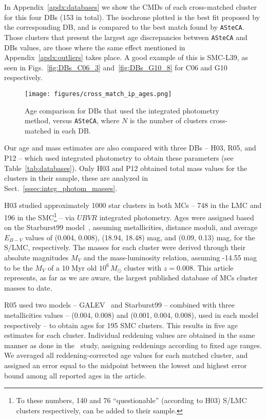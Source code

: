 \documentclass[draft]{aa}
\begin{document}
In Appendix~\ref{apdx:databases} we show the CMDs of each cross-matched cluster
for this four DBs (153 in total). The isochrone plotted is the best fit proposed
by the corresponding DB, and is compared to the best match found by
\texttt{ASteCA}.
Those clusters that present the largest age discrepancies between
\texttt{ASteCA} and DBs values, are those where the same effect mentioned in
Appendix~\ref{apdx:outliers} takes place. A good example of this is SMC-L39, as
seen in Figs.~\ref{fig:DBs_C06_3} and~\ref{fig:DBs_G10_8} for C06 and G10
respectively.\\


%

\begin{figure}
\centering
\texttt{[image: figures/cross\_match\_ip\_ages.png]}
\caption{Age comparison for DBs that used the integrated photometry
method, versus \texttt{ASteCA}, where $N$ is the number of clusters cross-matched in
each DB.\@}
\label{fig:cross_match_ip_age}
\end{figure}

Our age and mass estimates are also compared with three DBs -- H03, R05, and P12
-- which used integrated photometry to obtain these parameters (see
Table~\ref{tab:databases}). Only H03 and P12 obtained total mass values for the
clusters in their sample, these are analyzed in
Sect.~\ref{sssec:integ_photom_masses}.

H03 studied approximately 1000 star clusters in both MCs -- 748 in the LMC and
196 in the SMC\footnote{To these numbers, 140 and 76 ``questionable'' (according
to H03) S/LMC clusters respectively, can be added to their sample.} --
via $UBVR$ integrated photometry. Ages were assigned based on the Starburst99
model~\citep{Leitherer_1999}, assuming metallicities, distance moduli, and
average $E_{B-V}$ values of (0.004, 0.008), (18.94, 18.48) mag, and 
(0.09, 0.13) mag, for the S/LMC, respectively.
The masses for each cluster were derived through their absolute
magnitudes $M_V$ and the mass-luminosity relation, assuming -14.55 mag to be the
$M_V$ of a 10 Myr old $10^6\,M_{\odot}$ cluster with $z=0.008$.
This article represents, as far as we are aware, the largest
published database of MCs cluster masses to date.

R05 used two models -- GALEV~\citep{Anders_2003} and Starburst99 -- combined
with three metallicities values -- (0.004, 0.008) and (0.001, 0.004, 0.008),
used in each model respectively -- to obtain ages for 195 SMC clusters.
This results in five age estimates for each cluster. Individual reddening
values are obtained in the same manner as done in the~\cite{Harris_2004} study,
assigning reddenings according to fixed age ranges.
%
We averaged all reddening-corrected age values for each matched cluster,
and assigned an error equal to the midpoint between the lowest and
highest error bound among all reported ages in the article.
\end{document}
